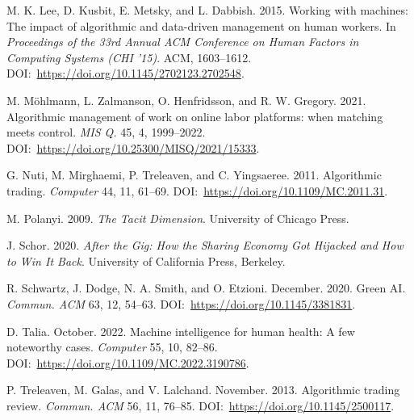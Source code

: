 \begin{thebibliography}{}
 M. K. Lee, D. Kusbit, E. Metsky, and L. Dabbish. 2015. Working with machines: The impact of algorithmic and data-driven management on human workers. In \textit{Proceedings of the 33rd Annual ACM Conference on Human Factors in Computing Systems (CHI '15)}. ACM, 1603--1612. DOI:~\href{https://doi.org/10.1145/2702123.2702548}{https://{\allowbreak}doi.{\allowbreak}org/{\allowbreak}10.{\allowbreak}1145/{\allowbreak}2702123.{\allowbreak}2702548}.

 M. M\"{o}hlmann, L. Zalmanson, O. Henfridsson, and R. W. Gregory. 2021. Algorithmic management of work on online labor platforms: when matching meets control. \textit{MIS Q.} 45, 4, 1999--2022. DOI:~\href{https://doi.org/10.25300/MISQ/2021/15333}{https://{\allowbreak}doi.{\allowbreak}org/{\allowbreak}10.{\allowbreak}25300/{\allowbreak}MISQ/{\allowbreak}2021/{\allowbreak}15333}.

 G. Nuti, M. Mirghaemi, P. Treleaven, and C. Yingsaeree. 2011. Algorithmic trading. \textit{Computer} 44, 11, 61--69. DOI:~\href{https://doi.org/10.1109/MC.2011.31}{https://{\allowbreak}doi.{\allowbreak}org/{\allowbreak}10.{\allowbreak}1109/{\allowbreak}MC.{\allowbreak}2011.31}.

 M. Polanyi. 2009. \textit{The Tacit Dimension}. University of Chicago Press.

 J. Schor. 2020. \textit{After the Gig: How the Sharing Economy Got Hijacked and How to Win It Back}. University of California Press, Berkeley.

 R. Schwartz, J. Dodge, N. A. Smith, and O. Etzioni. December. 2020. Green AI. \textit{Commun. ACM} 63, 12, 54--63. DOI:~\href{https://doi.org/10.1145/3381831}{https://{\allowbreak}doi.{\allowbreak}org/{\allowbreak}10.{\allowbreak}1145/{\allowbreak}3381831}.

 D. Talia. October. 2022. Machine intelligence for human health: A few noteworthy cases. \textit{Computer} 55, 10, 82--86. DOI:~\href{https://doi.org/10.1109/MC.2022.3190786}{https://{\allowbreak}doi.{\allowbreak}org/{\allowbreak}10.{\allowbreak}1109/{\allowbreak}MC.{\allowbreak}2022.{\allowbreak}3190786}.

 P. Treleaven, M. Galas, and V. Lalchand. November. 2013. Algorithmic trading review. \textit{Commun. ACM} 56, 11, 76--85. DOI:~\href{https://doi.org/10.1145/2500117}{https://{\allowbreak}doi.{\allowbreak}org/{\allowbreak}10.{\allowbreak}1145/{\allowbreak}2500117}.
\end{thebibliography}

%

